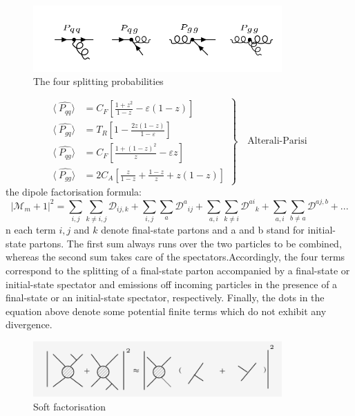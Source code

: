 \begin{figure}[h!]
\centering
\includegraphics[width=0.85\textwidth]{images/Intro/spiliting.png}
\caption{The four splitting probabilities}
\label{splitting}
\end{figure}

\begin{equation}
	\left.\begin{aligned}
\langle\:\hat{P_{qq}}\rangle &= C_F[\frac{1+z^2}{1-z}-\varepsilon(1-z)]\\
\langle\:\hat{P_{gq}}\rangle &= T_R[1-\frac{2z(1-z)}{1-\varepsilon}]\\
\langle\:\hat{P_{qg}}\rangle &= C_F[\frac{1+(1-z)^2}{z}-\varepsilon z]\\
\langle\:\hat{P_{gg}}\rangle &= 2C_A[\frac{z}{1-z}+\frac{1-z}{z}+z(1-z)]
\end{aligned}
	\right\}
	\quad \text{Alterali-Parisi
	}
\label{Alterali-Parisi}
\end{equation}
 the dipole factorisation formula:
 \begin{equation}
 |\mathcal{M}_m+1|^2 = \displaystyle\sum\limits_{i,j} \displaystyle\sum\limits_{k\neq i,j} \mathcal{D}_{ij,k} +\displaystyle\sum\limits_{i,j} \displaystyle\sum\limits_{a} {\mathcal{D}^a}_{ij}+\displaystyle\sum\limits_{a,i} \displaystyle\sum\limits_{k\neq i} {\mathcal{D}^{ai}}_{k}+\displaystyle\sum\limits_{a,i} \displaystyle\sum\limits_{b\neq a} \mathcal{D}^{aj,b}+...
 \end{equation}
n each term $ i, j $ and $ k $ denote final-state partons and a and b stand for initial-state partons. The first sum always runs over the two particles to be combined, whereas the second sum takes care of the spectators.Accordingly, the four terms correspond to the splitting of a final-state parton accompanied by a final-state or initial-state spectator and emissions off incoming particles in the presence of a final-state or an initial-state spectator, respectively. Finally, the dots in the equation above denote some potential finite terms which do not exhibit any divergence.
\begin{figure}[h!]
\centering
\includegraphics[width=0.85\textwidth]{images/Intro/soft.png}
\caption{Soft factorisation}
\end{figure}

